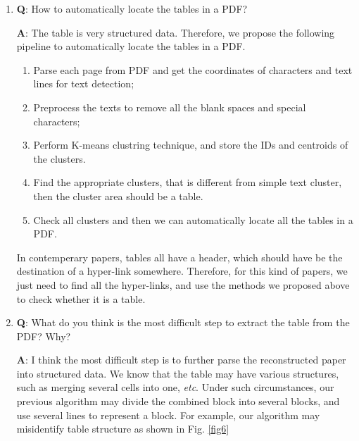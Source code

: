 \documentclass[12pt, a4paper]{article}
\theoremstyle{definition}
\begin{document}
\begin{enumerate}
	\item \textbf{Q}: How to automatically locate the tables in a PDF?
	
	\textbf{A}: The table is very structured data. Therefore, we propose the following pipeline to automatically locate the tables in a PDF.
	\begin{enumerate}
		\item Parse each page from PDF and get the coordinates of characters and text lines for text detection;
		\item Preprocess the texts to remove all the blank spaces and special characters;
		\item Perform K-means clustring technique, and store the IDs and centroids of the clusters.
		\item Find the appropriate clusters, that is different from simple text cluster, then the cluster area should be a table.
		\item Check all clusters and then we can automatically locate all the tables in a PDF.
	\end{enumerate}

	In contemperary papers, tables all have a header, which should have be the destination of a hyper-link somewhere. Therefore, for this kind of papers, we just need to find all the hyper-links, and use the methods we proposed above to check whether it is a table.
	\item \textbf{Q}: What do you think is the most difficult step to extract the table from the PDF? Why?
	
	\textbf{A}: I think the most difficult step is to further parse the reconstructed paper into structured data. We know that the table may have various structures, such as merging several cells into one, \textit{etc}. Under such circumstances, our previous algorithm may divide the combined block into several blocks, and use several lines to represent a block. For example, our algorithm may misidentify table structure as shown in Fig. \ref{fig6}


\end{enumerate}
\end{document}
